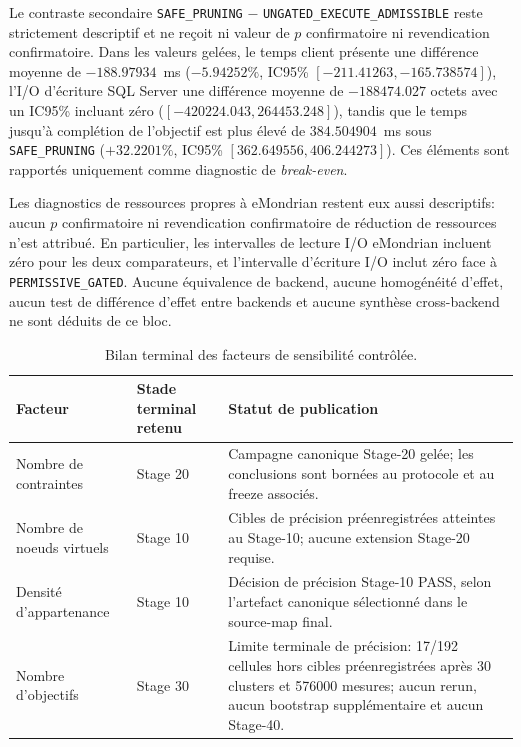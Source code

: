 Le contraste secondaire \texttt{SAFE\_PRUNING} $-$
\texttt{UNGATED\_EXECUTE\_ADMISSIBLE} reste strictement descriptif et ne reçoit ni
valeur de $p$ confirmatoire ni revendication confirmatoire. Dans les valeurs gelées, le temps
client présente une différence moyenne de $-188.97934$~ms ($-5.94252\%$,
IC95\% $[-211.41263,-165.738574]$), l'I/O d'écriture SQL Server une différence moyenne
de $-188474.027$ octets avec un IC95\% incluant zéro
($[-420224.043,264453.248]$), tandis que le temps jusqu'à complétion de l'objectif est
plus élevé de $384.504904$~ms sous \texttt{SAFE\_PRUNING} ($+32.2201\%$,
IC95\% $[362.649556,406.244273]$). Ces éléments sont rapportés uniquement comme
diagnostic de \emph{break-even}.

Les diagnostics de ressources propres à eMondrian restent eux aussi descriptifs: aucun
$p$ confirmatoire ni revendication confirmatoire de réduction de ressources n'est attribué.
En particulier, les intervalles de lecture I/O eMondrian incluent zéro pour les deux
comparateurs, et l'intervalle d'écriture I/O inclut zéro face à
\texttt{PERMISSIVE\_GATED}. Aucune équivalence de backend, aucune homogénéité d'effet,
aucun test de différence d'effet entre backends et aucune synthèse cross-backend ne sont
déduits de ce bloc.

\begin{table}[t]
\centering
\caption{Bilan terminal des facteurs de sensibilité contrôlée.}
\label{tab:sensitivity-final}
\small
\begin{tabular}{p{}p{}p{}}
\hline
Facteur & Stade terminal retenu & Statut de publication \\
\hline
Nombre de contraintes
& Stage 20
& Campagne canonique Stage-20 gelée; les conclusions sont bornées au protocole et au freeze associés. \\

Nombre de noeuds virtuels
& Stage 10
& Cibles de précision préenregistrées atteintes au Stage-10; aucune extension Stage-20 requise. \\

Densité d'appartenance
& Stage 10
& Décision de précision Stage-10 PASS, selon l'artefact canonique sélectionné dans le source-map final. \\

Nombre d'objectifs
& Stage 30
& Limite terminale de précision: 17/192 cellules hors cibles préenregistrées après 30 clusters et 576000 mesures; aucun rerun, aucun bootstrap supplémentaire et aucun Stage-40. \\
\hline
\end{tabular}
\end{table}


